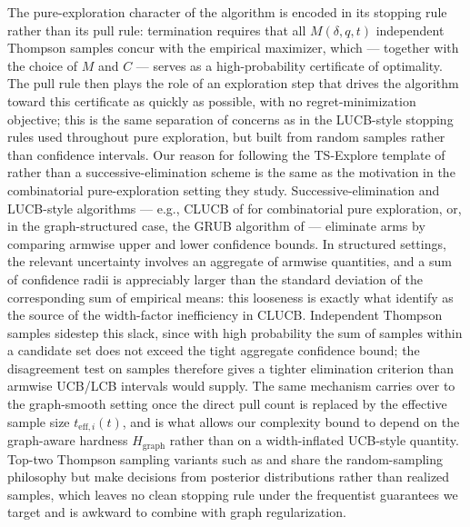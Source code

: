 \documentclass{article}
\begin{document}
The pure-exploration character of the algorithm is encoded in its stopping rule rather than its pull rule: termination requires that all $M(\delta,q,t)$ independent Thompson samples concur with the empirical maximizer, which — together with the choice of $M$ and $C$ — serves as a high-probability certificate of optimality. The pull rule then plays the role of an exploration step that drives the algorithm toward this certificate as quickly as possible, with no regret-minimization objective; this is the same separation of concerns as in the LUCB-style stopping rules used throughout pure exploration, but built from random samples rather than confidence intervals. Our reason for following the TS-Explore template of \citet{wang2022thompson} rather than a successive-elimination scheme is the same as the motivation in the combinatorial pure-exploration setting they study. Successive-elimination and LUCB-style algorithms — e.g., CLUCB of \citet{chen2014combinatorial} for combinatorial pure exploration, or, in the graph-structured case, the GRUB algorithm of \citet{thaker2022maximizing} — eliminate arms by comparing armwise upper and lower confidence bounds. In structured settings, the relevant uncertainty involves an aggregate of armwise quantities, and a sum of confidence radii is appreciably larger than the standard deviation of the corresponding sum of empirical means: this looseness is exactly what \citet{wang2022thompson} identify as the source of the width-factor inefficiency in CLUCB. Independent Thompson samples sidestep this slack, since with high probability the sum of samples within a candidate set does not exceed the tight aggregate confidence bound; the disagreement test on samples therefore gives a tighter elimination criterion than armwise UCB/LCB intervals would supply. The same mechanism carries over to the graph-smooth setting once the direct pull count is replaced by the effective sample size $t_{\mathrm{eff},i}(t)$, and is what allows our complexity bound to depend on the graph-aware hardness $H_{\mathrm{graph}}$ rather than on a width-inflated UCB-style quantity. Top-two Thompson sampling variants such as \citet{russo2016simple} and \citet{shang2020fixed} share the random-sampling philosophy but make decisions from posterior distributions rather than realized samples, which leaves no clean stopping rule under the frequentist guarantees we target and is awkward to combine with graph regularization.
\end{document}
